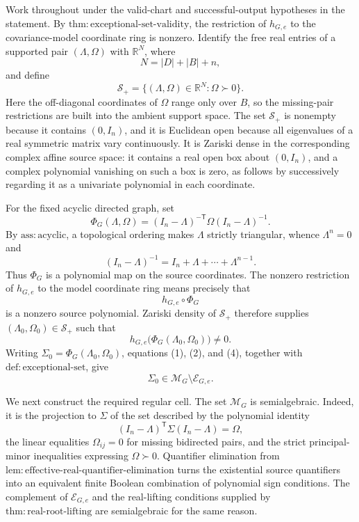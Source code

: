 Work throughout under the valid-chart and successful-output hypotheses in the statement.  By \(\mathrm{thm:exceptional\mbox{-}set\mbox{-}validity}\), the restriction of \(h_{G,e}\) to the covariance-model coordinate ring is nonzero.  Identify the free real entries of a supported pair \((\Lambda,\Omega)\) with \(\mathbb R^N\), where
\[
 N=|D|+|B|+n,
\]
and define
\[
 \mathcal S_+
 =\{(\Lambda,\Omega)\in\mathbb R^N:\Omega\succ0\}.
\tag{1}
\]
Here the off-diagonal coordinates of \(\Omega\) range only over \(B\), so the missing-pair restrictions are built into the ambient support space.  The set \(\mathcal S_+\) is nonempty because it contains \((0,I_n)\), and it is Euclidean open because all eigenvalues of a real symmetric matrix vary continuously.  It is Zariski dense in the corresponding complex affine source space: it contains a real open box about \((0,I_n)\), and a complex polynomial vanishing on such a box is zero, as follows by successively regarding it as a univariate polynomial in each coordinate.

For the fixed acyclic directed graph, set
\[
 \Phi_G(\Lambda,\Omega)
 =(I_n-\Lambda)^{-\mathsf T}\Omega(I_n-\Lambda)^{-1}.
\tag{2}
\]
By \(\mathrm{ass:acyclic}\), a topological ordering makes \(\Lambda\) strictly triangular, whence \(\Lambda^n=0\) and
\[
 (I_n-\Lambda)^{-1}=I_n+\Lambda+\cdots+\Lambda^{n-1}.
\tag{3}
\]
Thus \(\Phi_G\) is a polynomial map on the source coordinates.  The nonzero restriction of \(h_{G,e}\) to the model coordinate ring means precisely that
\[
 h_{G,e}\circ\Phi_G
\]
is a nonzero source polynomial.  Zariski density of \(\mathcal S_+\) therefore supplies \((\Lambda_0,\Omega_0)\in\mathcal S_+\) such that
\[
 h_{G,e}\bigl(\Phi_G(\Lambda_0,\Omega_0)\bigr)\ne0.
\tag{4}
\]
Writing \(\Sigma_0=\Phi_G(\Lambda_0,\Omega_0)\), equations (1), (2), and (4), together with \(\mathrm{def:exceptional\mbox{-}set}\), give
\[
 \Sigma_0\in\mathcal M_G\setminus\mathcal E_{G,e}.
\tag{5}
\]

We next construct the required regular cell.  The set \(\mathcal M_G\) is semialgebraic.  Indeed, it is the projection to \(\Sigma\) of the set described by the polynomial identity
\[
 (I_n-\Lambda)^{\mathsf T}\Sigma(I_n-\Lambda)=\Omega,
\tag{6}
\]
the linear equalities \(\Omega_{ij}=0\) for missing bidirected pairs, and the strict principal-minor inequalities expressing \(\Omega\succ0\).  Quantifier elimination from \(\mathrm{lem:effective\mbox{-}real\mbox{-}quantifier\mbox{-}elimination}\) turns the existential source quantifiers into an equivalent finite Boolean combination of polynomial sign conditions.  The complement of \(\mathcal E_{G,e}\) and the real-lifting conditions supplied by \(\mathrm{thm:real\mbox{-}root\mbox{-}lifting}\) are semialgebraic for the same reason.

